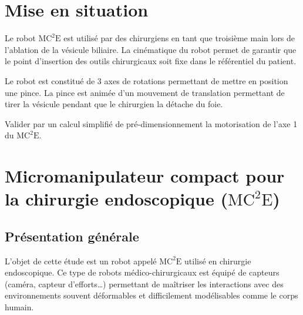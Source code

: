 \documentclass[10pt,fleqn]{article} %
\begin{document}

\vspace{4.5cm}
\pagestyle{fancy}
\thispagestyle{plain}


\def\columnseprulecolor{\color{ocre}}
\setlength{\columnseprule}{0.4pt} 

\ifprof
\else
\fi

\section*{Mise en situation}
\ifprof
\else
\fi
Le robot $\text{MC}^2\text{E}$ est utilisé par des chirurgiens en tant que troisième main lors de l'ablation de la vésicule biliaire. La cinématique du robot permet de garantir que le point d'insertion des outils chirurgicaux soit fixe dans le référentiel du patient. 

Le robot est constitué de 3 axes de rotations permettant de mettre en position une pince. La pince est animée d'un mouvement de translation permettant de tirer la vésicule pendant que le chirurgien la détache du foie. 


\begin{obj}
Valider par un calcul simplifié de pré-dimensionnement la motorisation de l'axe 1 du  $\text{MC}^2\text{E}$.

\end{obj}





\section{Micromanipulateur compact pour la chirurgie endoscopique ($\text{MC}^2\text{E}$)}
\subsection{Présentation générale}
L’objet de cette étude est un robot appelé $\text{MC}^2\text{E}$ utilisé en chirurgie endoscopique. Ce type de
robots médico-chirurgicaux est équipé de capteurs (caméra, capteur d’efforts…) permettant de maîtriser
les interactions avec des environnements souvent déformables et difficilement modélisables comme le
corps humain.
\end{document}
